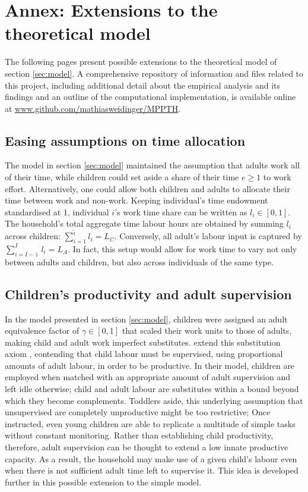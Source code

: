 \documentclass[a4paper,12pt]{article}
\theoremstyle{plain}
\theoremstyle{definition}
\theoremstyle{definition}
\theoremstyle{definition}
\theoremstyle{definition}
\begin{document}
\newpage
\appendix

\section{Annex: Extensions to the theoretical model}

The following pages present possible extensions to the theoretical model of section \ref{sec:model}. A comprehensive repository of information and files related to this project, including additional detail about the empirical analysis and its findings and an outline of the computational implementation, is available online at \href{https://github.com/mathiasweidinger/MPPTH}{www.github.com/mathiasweidinger/MPPTH}.

\subsection{Easing assumptions on time allocation}
\label{app:time_allocation}
The model in section \ref{sec:model} maintained the assumption that adults work all of their time, while children could set aside a share of their time $e\geq1$ to work effort. Alternatively, one could allow both children and adults to allocate their time between work and non-work. Keeping individual's time endowment standardised at 1, individual $i$'s work time share can be written as $l_i\in[0,1]$. The household's total aggregate time labour hours are obtained by summing $l_i$ across children: $\sum_{i=1}^{\hat{\imath}}l_i=L_C$. Conversely, all adult's labour input is captured by $\sum_{i={I-\hat{\imath}}}^I l_i=L_A$. In fact, this setup would allow for work time to vary not only between adults and children, but also across individuals of the same type.

\subsection{Children's productivity and adult supervision}
\label{app:adult_supervision}
In the model presented in section \ref{sec:model}, children were assigned an adult equivalence factor of $\gamma\in[0,1]$ that scaled their work units to those of adults, making child and adult work imperfect substitutes. \citet{Bar2009} extend this substitution axiom \citep{Basu1998}, contending that child labour must be supervised, using proportional amounts of adult labour, in order to be productive. In their model, children are employed when matched with an appropriate amount of adult supervision and left idle otherwise; child and adult labour are substitutes within a bound beyond which they become complements. Toddlers aside, this underlying assumption that unsupervised are completely unproductive might be too restrictive; Once instructed, even young children are able to replicate a multitude of simple tasks without constant monitoring. Rather than establishing child productivity, therefore, adult supervision can be thought to extend a low innate productive capacity. As a result, the household may make use of a given child's labour even when there is not sufficient adult time left to supervise it. This idea is developed further in this possible extension to the simple model.
\end{document}
